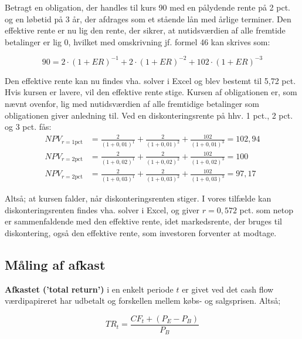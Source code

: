 \documentclass[10pt,reqno, usenames]{article}
\begin{document}
\begin{tcolorbox}[breakable, colback=red!5!white, colframe=red!50!black, title= Eksempel 5: Obligationer og udbetalinger]
Betragt en obligation, der handles til kurs 90 med en pålydende rente på 2 pct. og en løbetid på 3 år, der afdrages som et stående lån med årlige terminer. Den effektive rente er nu lig den rente, der sikrer, at nutidsværdien af alle fremtide betalinger er lig 0, hvilket med omskrivning jf. formel 46 kan skrives som: 

\begin{equation}
    90 = 2 \cdot (1+ER)^{-1} + 2 \cdot (1+ER)^{-2} + 102 \cdot (1+ER)^{-3}
\end{equation}

Den effektive rente kan nu findes vha. solver i Excel og blev bestemt til 5,72 pct. Hvis kursen er lavere, vil den effektive rente stige. Kursen af obligationen er, som nævnt ovenfor, lig med nutidsværdien af alle fremtidige betalinger som obligationen giver anledning til. Ved en diskonteringsrente på hhv. 1 pct., 2 pct. og 3 pct. fås: 
\begin{align*}
    NPV_{r=1 \text{pct}} &= \frac{2}{(1+0,01)^1} + \frac{2}{(1+0,01)^2} + \frac{102}{(1+0,01)^3} = 102,94 \\
    NPV_{r=2 \text{pct}} &= \frac{2}{(1+0,02)^1} + \frac{2}{(1+0,02)^2} + \frac{102}{(1+0,02)^3} = 100 \\
    NPV_{r=2 \text{pct}} &= \frac{2}{(1+0,03)^1} + \frac{2}{(1+0,03)^2} + \frac{102}{(1+0,03)^3} = 97,17 
\end{align*}

Altså; at kursen falder, når diskonteringsrenten stiger. I vores tilfælde kan diskonteringsrenten findes vha. solver i Excel, og giver $r= 0,572$ pct. som netop er sammenfaldende med den effektive rente, idet markedsrente, der bruges til diskontering, også den effektive rente, som investoren forventer at modtage.
\end{tcolorbox}

\subsection{Måling af afkast}
\textbf{Afkastet ('total return')} i en enkelt periode $t$ er givet ved det cash flow værdipapireret har udbetalt og forskellen mellem købs- og salgsprisen. Altså;  

\begin{equation}
    TR_t = \frac{CF_t + (P_E - P_B)}{P_B}
\end{equation}
\end{document}
